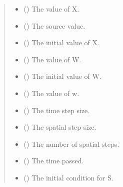 \documentclass[a4paper,11pt,english,openany]{sphinxmanual}
\begin{document}
\begin{fulllineitems}
\begin{fulllineitems}
\begin{quote}
\begin{description}
\begin{itemize}
\item {} 
\sphinxAtStartPar
{} () \textendash{} The value of X.

\item {} 
\sphinxAtStartPar
{} () \textendash{} The source value.

\item {} 
\sphinxAtStartPar
{} () \textendash{} The initial value of X.

\item {} 
\sphinxAtStartPar
{} () \textendash{} The value of W.

\item {} 
\sphinxAtStartPar
{} () \textendash{} The initial value of W.

\item {} 
\sphinxAtStartPar
{} () \textendash{} The value of w.

\item {} 
\sphinxAtStartPar
{} () \textendash{} The time step size.

\item {} 
\sphinxAtStartPar
{} () \textendash{} The spatial step size.

\item {} 
\sphinxAtStartPar
{} () \textendash{} The number of spatial steps.

\item {} 
\sphinxAtStartPar
{} () \textendash{} The time passed.

\item {} 
\sphinxAtStartPar
{} () \textendash{} The initial condition for S.


\end{itemize}
\end{description}
\end{quote}
\end{fulllineitems}
\end{fulllineitems}
\end{document}
